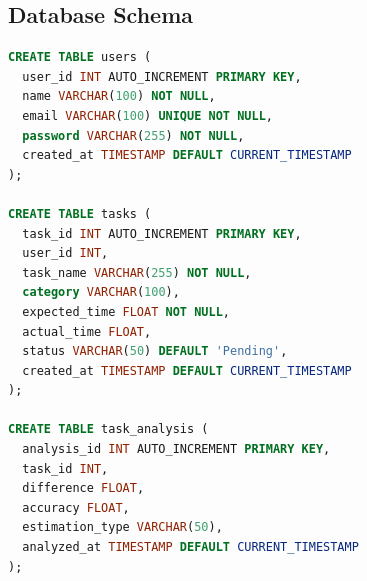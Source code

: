 \begin{appendices}
\section{Database Schema}
\begin{lstlisting}[language=SQL]
CREATE TABLE users (
  user_id INT AUTO_INCREMENT PRIMARY KEY,
  name VARCHAR(100) NOT NULL,
  email VARCHAR(100) UNIQUE NOT NULL,
  password VARCHAR(255) NOT NULL,
  created_at TIMESTAMP DEFAULT CURRENT_TIMESTAMP
);

CREATE TABLE tasks (
  task_id INT AUTO_INCREMENT PRIMARY KEY,
  user_id INT,
  task_name VARCHAR(255) NOT NULL,
  category VARCHAR(100),
  expected_time FLOAT NOT NULL,
  actual_time FLOAT,
  status VARCHAR(50) DEFAULT 'Pending',
  created_at TIMESTAMP DEFAULT CURRENT_TIMESTAMP
);

CREATE TABLE task_analysis (
  analysis_id INT AUTO_INCREMENT PRIMARY KEY,
  task_id INT,
  difference FLOAT,
  accuracy FLOAT,
  estimation_type VARCHAR(50),
  analyzed_at TIMESTAMP DEFAULT CURRENT_TIMESTAMP
);
\end{lstlisting}
\end{appendices}
